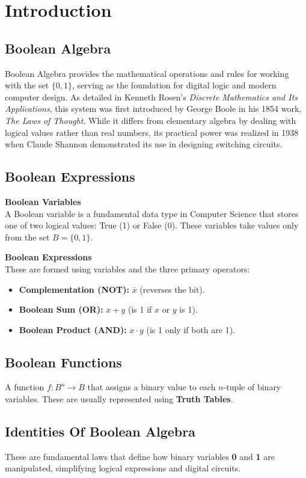 \section{Introduction}

\subsection{Boolean Algebra}
Boolean Algebra provides the mathematical operations and rules for working with the set $\{0, 1\}$, serving as the foundation for digital logic and modern computer design. As detailed in Kenneth Rosen’s \textit{Discrete Mathematics and Its Applications}, this system was first introduced by George Boole in his 1854 work, \textit{The Laws of Thought}. While it differs from elementary algebra by dealing with logical values rather than real numbers, its practical power was realized in 1938 when Claude Shannon demonstrated its use in designing switching circuits.

\subsection{Boolean Expressions}
\textbf{Boolean Variables} \\
A Boolean variable is a fundamental data type in Computer Science that stores one of two logical values: True (1) or False (0). These variables take values only from the set $B = \{0,1\}$.


\noindent \textbf{Boolean Expressions} \\
These are formed using variables and the three primary operators:
\begin{itemize}
    \item \textbf{Complementation (NOT):} $\bar{x}$ (reverses the bit).
    \item \textbf{Boolean Sum (OR):} $x + y$ (is 1 if $x$ or $y$ is 1).
    \item \textbf{Boolean Product (AND):} $x \cdot y$ (is 1 only if both are 1).
\end{itemize}


\subsection{Boolean Functions}
A function $f: B^n \to B$ that assigns a binary value to each $n$-tuple of binary variables. These are usually represented using \textbf{Truth Tables}.

\subsection{Identities Of Boolean Algebra}
These are fundamental laws that define how binary variables \textbf{0} and \textbf{1} are manipulated, simplifying logical expressions and digital circuits.

